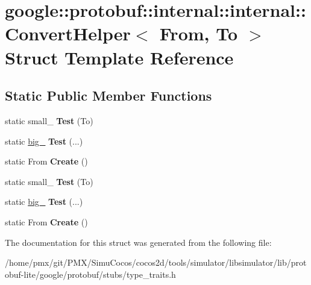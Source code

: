 \hypertarget{structgoogle_1_1protobuf_1_1internal_1_1internal_1_1ConvertHelper}{}\section{google\+:\+:protobuf\+:\+:internal\+:\+:internal\+:\+:Convert\+Helper$<$ From, To $>$ Struct Template Reference}
\label{structgoogle_1_1protobuf_1_1internal_1_1internal_1_1ConvertHelper}
\subsection*{Static Public Member Functions}
\begin{DoxyCompactItemize}
\item 
\mbox{\label{structgoogle_1_1protobuf_1_1internal_1_1internal_1_1ConvertHelper_a7f9861dc3c0cef77984d66eec61fe9bf}} 
static small\+\_\+ {\bfseries Test} (To)
\item 
\mbox{\label{structgoogle_1_1protobuf_1_1internal_1_1internal_1_1ConvertHelper_aa16ca45c5e58dd1fbd8ef9eee3133285}} 
static \hyperlink{structgoogle_1_1protobuf_1_1internal_1_1big__}{big\+\_\+} {\bfseries Test} (...)
\item 
\mbox{\label{structgoogle_1_1protobuf_1_1internal_1_1internal_1_1ConvertHelper_aa09a9c16e382f99c5517e7b29d32efff}} 
static From {\bfseries Create} ()
\item 
\mbox{\label{structgoogle_1_1protobuf_1_1internal_1_1internal_1_1ConvertHelper_a7f9861dc3c0cef77984d66eec61fe9bf}} 
static small\+\_\+ {\bfseries Test} (To)
\item 
\mbox{\label{structgoogle_1_1protobuf_1_1internal_1_1internal_1_1ConvertHelper_aa16ca45c5e58dd1fbd8ef9eee3133285}} 
static \hyperlink{structgoogle_1_1protobuf_1_1internal_1_1big__}{big\+\_\+} {\bfseries Test} (...)
\item 
\mbox{\label{structgoogle_1_1protobuf_1_1internal_1_1internal_1_1ConvertHelper_aa09a9c16e382f99c5517e7b29d32efff}} 
static From {\bfseries Create} ()
\end{DoxyCompactItemize}


The documentation for this struct was generated from the following file\+:\begin{DoxyCompactItemize}
\item 
/home/pmx/git/\+P\+M\+X/\+Simu\+Cocos/cocos2d/tools/simulator/libsimulator/lib/protobuf-\/lite/google/protobuf/stubs/type\+\_\+traits.\+h\end{DoxyCompactItemize}
